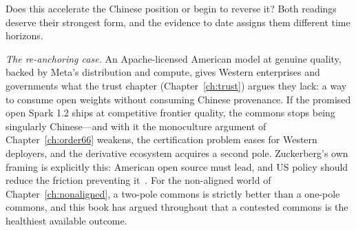 Does this accelerate the Chinese position or begin to reverse it? Both readings deserve their strongest form, and the evidence to date assigns them different time horizons.

\emph{The re-anchoring case.} An Apache-licensed American model at genuine quality, backed by Meta's distribution and compute, gives Western enterprises and governments what the trust chapter (Chapter~\ref{ch:trust}) argues they lack: a way to consume open weights without consuming Chinese provenance. If the promised open Spark 1.2 ships at competitive frontier quality, the commons stops being singularly Chinese---and with it the monoculture argument of Chapter~\ref{ch:order66} weakens, the certification problem eases for Western deployers, and the derivative ecosystem acquires a second pole. Zuckerberg's own framing is explicitly this: American open source must lead, and US policy should reduce the friction preventing it~\cite{zuck-letter}. For the non-aligned world of Chapter~\ref{ch:nonaligned}, a two-pole commons is strictly better than a one-pole commons, and this book has argued throughout that a contested commons is the healthiest available outcome.

